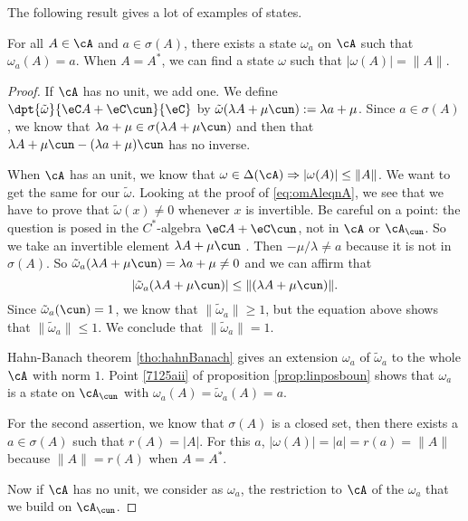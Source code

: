 The following result gives a lot of examples of states.

\begin{lemma}
 For all $A\in \cA$ and $a\in\sigma(A)$, there exists a state $\omega_a$ on $\cA$ such that $\omega_a(A)=a$. When $A=A^*$, we can find a state $\omega$ such that $| \omega(A) |=\| A \|$. \label{lem:omAenomA}
\end{lemma}

\begin{proof}
If $\cA$ has no unit, we add one. We define $\dpt{\tilde\omega}{\eC A+\eC\cun}{\eC}$ by $\tilde\omega(\lambda A+\mu\cun):=\lambda a+\mu$. Since $a\in\sigma(A)$, we know that $\lambda a+\mu\in\sigma(\lambda A+\mu\cun)$ and then that $\lambda A+\mu\cun-(\lambda  a+\mu)\cun$ has no inverse. 

When $\cA$ has an unit, we know that $\omega\in\Delta(\cA)\Rightarrow | \omega(A) |\leq \| A \|$. We want to get the same for our $\tilde\omega$. Looking at the proof of \eqref{eq:omAleqnA}, we see that we have to prove that $\tilde\omega(x)\neq 0$ whenever $x$ is invertible. Be careful on a point: the question is posed in the $C^*$-algebra $\eC A+\eC\cun$, not in $\cA$ or $\cA_{\cun}$. So we take an invertible element $\lambda A+\mu\cun$ . Then $-\mu/\lambda\neq a$ because it is not in $\sigma(A)$. So $\tilde\omega_a(\lambda A+\mu\cun)=\lambda a+\mu\neq 0$ and we can affirm that
\begin{equation}
| \tilde\omega_a(\lambda A+\mu\cun) |\leq \| (\lambda A+\mu\cun) \|.
\end{equation}
Since $\tilde\omega_a(\cun)=1$, we know that $\| \tilde\omega_a \|\geq 1$, but the equation above shows that $\| \tilde\omega_a \|\leq 1$. We conclude that $\| \tilde\omega_a \|=1$.

Hahn-Banach theorem \ref{tho:hahnBanach} gives an extension $\omega_a$ of $\tilde\omega_a$ to the whole $\cA$ with norm $1$. 
Point \ref{7125aii} of proposition \ref{prop:linposboun} shows that $\omega_a$ is a state on $\cA_{\cun}$ with $\omega_a(A)=\tilde\omega_a(A)=a$. 

For the second assertion, we know that $\sigma(A)$ is a closed set, then there exists a $a\in\sigma(A)$ such that $r(A)=| A |$. For this $a$, $| \omega(A) |=| a |=r(a)=\| A \|$ because $\| A \|=r(A)$ when $A=A^*$. 

Now if $\cA$ has no unit, we consider as $\omega_a$, the restriction to $\cA$ of the $\omega_a$ that we build on $\cA_{\cun}$.

\end{proof}


